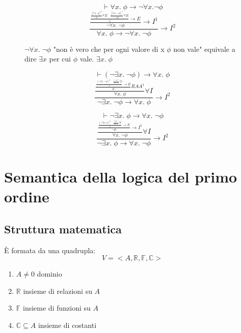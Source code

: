 \documentclass{article}
\theoremstyle{break}
\theoremstyle{break}
\theoremstyle{break}
\theoremstyle{break}
\begin{document}
\begin{figure}[H]
  \begin{exercise}
    \[
    \vdash \forall x.\; \phi \to \neg \forall x. \neg \phi
    \]
    \[
      \frac{\frac{\frac{\frac{[\forall x.\; \phi]^2}{\phi} \forall E \;\;\; \frac{[\forall x.\; \neg \phi]^1}{\neg \phi} \forall E}{\bot} \to E}{\neg \forall x.\; \neg \phi}\to I^1}{\forall x.\; \phi \to  \neg \forall x.\; \neg \phi} \to I^2
    \] 

    \( \neg \forall x.\; \neg \phi \) "non è vero che per ogni valore di x \( \phi \) non vale" equivale a dire
    \( \exists x \) per cui \( \phi \) vale. \( \exists x. \;\phi \) 
  \end{exercise}
\end{figure}

\begin{figure}[H]
  \begin{exercise}
    \[
    \vdash (\neg \exists x.\; \neg \phi) \to \forall x.\; \phi
    \] 
    \[
      \frac{\frac{\frac{\frac{[\neg \exists x.\; \neg \phi]^2 \;\;\;\;\frac{[\neg \phi]^1}{\exists x.\; \neg \phi} \exists I}{\bot} \to E}{\phi} RAA^1}{\forall x.\; \phi} \forall I}{\neg \exists x.\; \neg \phi \to \forall x.\; \phi} \to I^2
    \] 
  \end{exercise}
\end{figure}

\begin{figure}[H]
  \begin{exercise}
    \[
    \vdash \neg \exists x.\; \phi \to \forall x.\; \neg \phi
    \] 
    \[
      \frac{\frac{\frac{\frac{[\neg \exists x.\; \phi]^2 \;\;\;\;\frac{[\phi]^1}{\exists x.\;\phi} \exists I}{\bot}\to E}{\neg \phi} \to I^1}{\forall x.\; \neg \phi}\forall I}{\neg \exists x.\; \phi \to \forall x.\; \neg \phi} \to I^2
    \] 
  \end{exercise}
\end{figure}

\section{Semantica della logica del primo ordine}
\subsection{Struttura matematica}
È formata da una quadrupla:
\[
V = <A, \mathbb{R}, \mathbb{F}, \mathbb{C}>
\]  
\begin{enumerate}
  \item \( A \neq 0 \) dominio
  \item \( \mathbb{R} \) insieme di relazioni su \( A \) 
  \item \( \mathbb{F} \) insieme di funzioni su \( A \)
  \item \( \mathbb{C} \subseteq A \) insieme di costanti
\end{enumerate}
\end{document}
